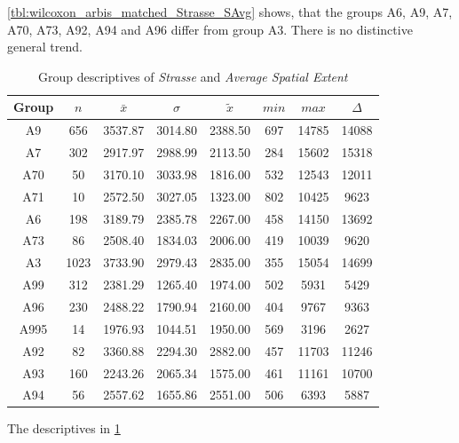 \cref{tbl:wilcoxon_arbis_matched_Strasse_SAvg} shows, that the groups A6, A9, A7, A70, A73, A92, A94 and A96 differ from group A3. There is no distinctive general trend.
\begin{table}[ht!]
	\tiny
	\centering
	\begin{tabular}{c|c|c|c|c|c|c|c}
		\toprule
		Group & $n$ & $\bar{x}$ & $\sigma$ & $\tilde{x}$ & $min$ & $max$ & $\Delta$ \\
		\midrule
		A9   & 656  & 3537.87 & 3014.80 & 2388.50 & 697 & 14785 & 14088 \\ 
		A7   & 302  & 2917.97 & 2988.99 & 2113.50 & 284 & 15602 & 15318 \\ 
		A70  & 50   & 3170.10 & 3033.98 & 1816.00 & 532 & 12543 & 12011 \\ 
		A71  & 10   & 2572.50 & 3027.05 & 1323.00 & 802 & 10425 & 9623  \\ 
		A6   & 198  & 3189.79 & 2385.78 & 2267.00 & 458 & 14150 & 13692 \\ 
		A73  & 86   & 2508.40 & 1834.03 & 2006.00 & 419 & 10039 & 9620  \\ 
		A3   & 1023 & 3733.90 & 2979.43 & 2835.00 & 355 & 15054 & 14699 \\ 
		A99  & 312  & 2381.29 & 1265.40 & 1974.00 & 502 & 5931  & 5429  \\ 
		A96  & 230  & 2488.22 & 1790.94 & 2160.00 & 404 & 9767  & 9363  \\ 
		A995 & 14   & 1976.93 & 1044.51 & 1950.00 & 569 & 3196  & 2627  \\ 
		A92  & 82   & 3360.88 & 2294.30 & 2882.00 & 457 & 11703 & 11246 \\ 
		A93  & 160  & 2243.26 & 2065.34 & 1575.00 & 461 & 11161 & 10700 \\  
		A94  & 56   & 2557.62 & 1655.86 & 2551.00 & 506 & 6393  & 5887  \\ 
		\bottomrule
	\end{tabular}
	\caption{Group descriptives of \textit{Strasse} and \textit{Average Spatial Extent}}
	\label{tbl:descriptives_arbis_matched_Strasse_SAvg}
\end{table}
The descriptives in \cref{tbl:descriptives_arbis_matched_Strasse_SAvg}

